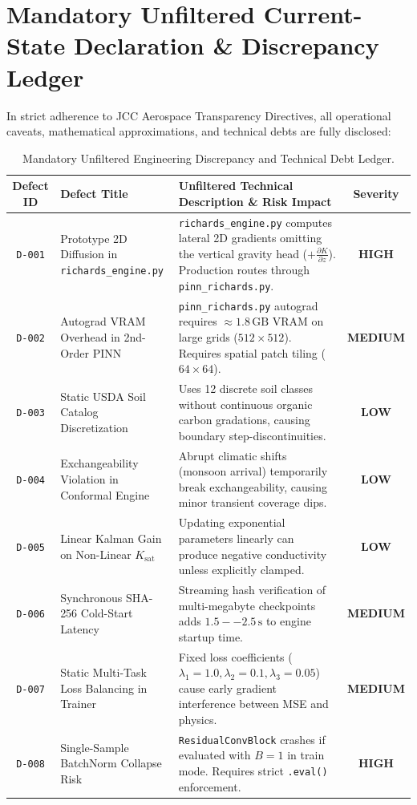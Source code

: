 \documentclass[11pt,a4paper]{article}
\theoremstyle{definition}
\theoremstyle{remark}
\begin{document}
\section{Mandatory Unfiltered Current-State Declaration \& Discrepancy Ledger}

In strict adherence to JCC Aerospace Transparency Directives, all operational caveats, mathematical approximations, and technical debts are fully disclosed:

\begin{table}[h!]
\centering
\scriptsize
\begin{tabular}{clp{7.5cm}c}
\toprule
\textbf{Defect ID} & \textbf{Defect Title} & \textbf{Unfiltered Technical Description \& Risk Impact} & \textbf{Severity} \\
\midrule
\texttt{D-001} & Prototype 2D Diffusion in \texttt{richards\_engine.py} & \texttt{richards\_engine.py} computes lateral 2D gradients omitting the vertical gravity head ($+\frac{\partial K}{\partial z}$). Production routes through \texttt{pinn\_richards.py}. & \textbf{HIGH} \\
\texttt{D-002} & Autograd VRAM Overhead in 2nd-Order PINN & \texttt{pinn\_richards.py} autograd requires $\approx 1.8\,\text{GB}$ VRAM on large grids ($512 \times 512$). Requires spatial patch tiling ($64 \times 64$). & \textbf{MEDIUM} \\
\texttt{D-003} & Static USDA Soil Catalog Discretization & Uses 12 discrete soil classes without continuous organic carbon gradations, causing boundary step-discontinuities. & \textbf{LOW} \\
\texttt{D-004} & Exchangeability Violation in Conformal Engine & Abrupt climatic shifts (monsoon arrival) temporarily break exchangeability, causing minor transient coverage dips. & \textbf{LOW} \\
\texttt{D-005} & Linear Kalman Gain on Non-Linear $K_{\text{sat}}$ & Updating exponential parameters linearly can produce negative conductivity unless explicitly clamped. & \textbf{LOW} \\
\texttt{D-006} & Synchronous SHA-256 Cold-Start Latency & Streaming hash verification of multi-megabyte checkpoints adds $1.5--2.5\,\text{s}$ to engine startup time. & \textbf{MEDIUM} \\
\texttt{D-007} & Static Multi-Task Loss Balancing in Trainer & Fixed loss coefficients ($\lambda_1=1.0, \lambda_2=0.1, \lambda_3=0.05$) cause early gradient interference between MSE and physics. & \textbf{MEDIUM} \\
\texttt{D-008} & Single-Sample BatchNorm Collapse Risk & \texttt{ResidualConvBlock} crashes if evaluated with $B=1$ in train mode. Requires strict \texttt{.eval()} enforcement. & \textbf{HIGH} \\
\bottomrule
\end{tabular}
\caption{Mandatory Unfiltered Engineering Discrepancy and Technical Debt Ledger.}
\label{tab:discrepancy_ledger}
\end{table}
\end{document}
